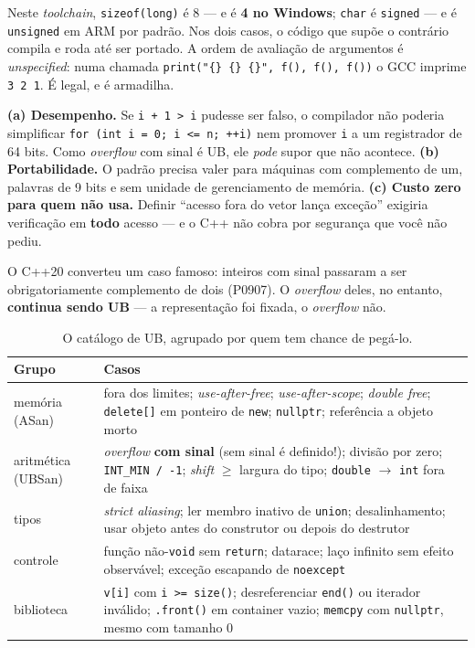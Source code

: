 Neste \emph{toolchain}, \texttt{sizeof(long)} é 8 --- e é \textbf{4 no Windows};
\texttt{char} é \texttt{signed} --- e é \texttt{unsigned} em ARM por padrão. Nos
dois casos, o código que supõe o contrário compila e roda até ser portado. A
ordem de avaliação de argumentos é \emph{unspecified}: numa chamada
\texttt{print("\{\} \{\} \{\}", f(), f(), f())} o GCC imprime \texttt{3 2 1}. É
legal, e é armadilha.

\begin{porque}
\textbf{(a) Desempenho.} Se \texttt{i + 1 > i} pudesse ser falso, o compilador não
poderia simplificar \texttt{for (int i = 0; i <= n; ++i)} nem promover \texttt{i}
a um registrador de 64 bits. Como \emph{overflow} com sinal é UB, ele \emph{pode}
supor que não acontece.
\textbf{(b) Portabilidade.} O padrão precisa valer para máquinas com complemento
de um, palavras de 9 bits e sem unidade de gerenciamento de memória.
\textbf{(c) Custo zero para quem não usa.} Definir ``acesso fora do vetor lança
exceção'' exigiria verificação em \textbf{todo} acesso --- e o C++ não cobra por
segurança que você não pediu.
\end{porque}

O C++20 converteu um caso famoso: inteiros com sinal passaram a ser
obrigatoriamente complemento de dois (P0907). O \emph{overflow} deles, no
entanto, \textbf{continua sendo UB} --- a representação foi fixada, o
\emph{overflow} não.

\begin{table}[htbp]
\centering
\caption{O catálogo de UB, agrupado por quem tem chance de pegá-lo.}
\label{tab:ub-catalogo}
\footnotesize
\begin{tabular}{@{}ll@{}}
\toprule
\textbf{Grupo} & \textbf{Casos} \\
\midrule
memória (ASan) & fora dos limites; \emph{use-after-free}; \emph{use-after-scope};
                 \emph{double free}; \texttt{delete[]} em ponteiro de \texttt{new};
                 \texttt{nullptr}; referência a objeto morto \\
aritmética (UBSan) & \emph{overflow} \textbf{com sinal} (sem sinal é definido!);
                 divisão por zero; \texttt{INT\_MIN / -1}; \emph{shift} $\geq$
                 largura do tipo; \texttt{double} $\rightarrow$ \texttt{int} fora
                 de faixa \\
tipos          & \emph{strict aliasing}; ler membro inativo de \texttt{union};
                 desalinhamento; usar objeto antes do construtor ou depois do
                 destrutor \\
controle       & função não-\texttt{void} sem \texttt{return}; \gls{datarace};
                 laço infinito sem efeito observável; exceção escapando de
                 \texttt{noexcept} \\
biblioteca     & \texttt{v[i]} com \texttt{i >= size()}; desreferenciar
                 \texttt{end()} ou iterador inválido; \texttt{.front()} em
                 container vazio; \texttt{memcpy} com \texttt{nullptr}, mesmo com
                 tamanho 0 \\
\bottomrule
\end{tabular}
\end{table}

